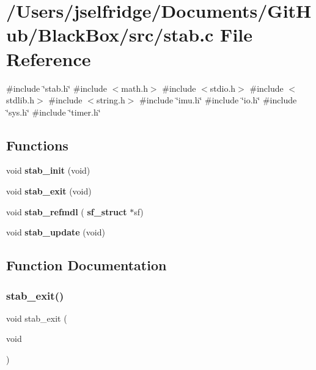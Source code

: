 \section{/\+Users/jselfridge/\+Documents/\+Git\+Hub/\+Black\+Box/src/stab.c File Reference}
\label{stab_8c}
{\ttfamily \#include \char`\"{}stab.\+h\char`\"{}}\newline
{\ttfamily \#include $<$math.\+h$>$}\newline
{\ttfamily \#include $<$stdio.\+h$>$}\newline
{\ttfamily \#include $<$stdlib.\+h$>$}\newline
{\ttfamily \#include $<$string.\+h$>$}\newline
{\ttfamily \#include \char`\"{}imu.\+h\char`\"{}}\newline
{\ttfamily \#include \char`\"{}io.\+h\char`\"{}}\newline
{\ttfamily \#include \char`\"{}sys.\+h\char`\"{}}\newline
{\ttfamily \#include \char`\"{}timer.\+h\char`\"{}}\newline
\subsection*{Functions}
\begin{DoxyCompactItemize}
\item 
void \textbf{ stab\+\_\+init} (void)
\item 
void \textbf{ stab\+\_\+exit} (void)
\item 
void \textbf{ stab\+\_\+refmdl} (\textbf{ sf\+\_\+struct} $\ast$sf)
\item 
void \textbf{ stab\+\_\+update} (void)
\end{DoxyCompactItemize}


\subsection{Function Documentation}
\mbox{\label{stab_8c_ae1c92a73e18225638229accab22b0baf}} 
\subsubsection{stab\+\_\+exit()}
{\footnotesize\ttfamily void stab\+\_\+exit (\begin{DoxyParamCaption}\item[{void}]{ }\end{DoxyParamCaption})}

